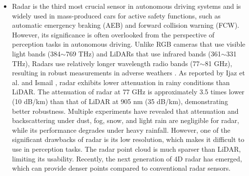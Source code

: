 \documentclass[rnd]{mas_proposal}
\begin{document}
\begin{itemize}
      \item Radar is the third most crucial sensor in autonomous driving systems and is widely used in mass-produced cars for active safety functions, such as automatic emergency braking (AEB) and forward collision warning (FCW). However, its significance is often overlooked from the perspective of perception tasks in autonomous driving. Unlike RGB cameras that use visible light bands (384$\sim$769 THz) and LiDARs that use infrared bands (361$\sim$331 THz), Radars use relatively longer wavelength radio bands (77$\sim$81 GHz), resulting in robust measurements in adverse weathers \cite{Paek2022Jun}. As reported by Ijaz et al. \cite{ijaz2012analysis} and Ismail \cite{gultepe2008measurements}, radar exhibits lower attenuation in rainy conditions than LiDAR. The attenuation of radar at 77 GHz is approximately 3.5 times lower (10 dB/km) than that of LiDAR at 905 nm (35 dB/km), demonstrating better robustness. Multiple experiments \cite{adams2012robotic, brooker2007seeing, xu2022learned, gourova2017analysis, zang2019impact} have revealed that attenuation and backscattering under dust, fog, snow, and light rain are negligible for radar, while its performance degrades under heavy rainfall. However, one of the significant drawbacks of radar is its low resolution, which makes it difficult to use in perception tasks. The radar point cloud is much sparser than LiDAR, limiting its usability. Recently, the next generation of 4D radar has emerged, which can provide denser points compared to conventional radar sensors.




\end{itemize}
\end{document}

